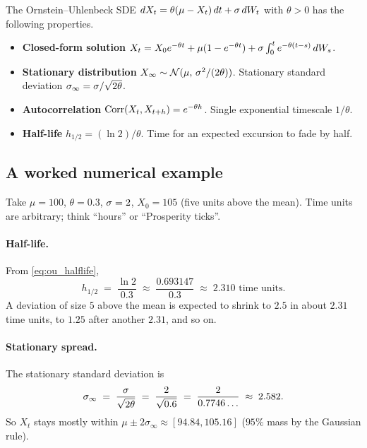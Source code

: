 \begin{keyfactbox}
The Ornstein--Uhlenbeck SDE
\(dX_t = \theta(\mu - X_t)\,dt + \sigma\,dW_t\) with
$\theta > 0$ has the following properties.
\begin{itemize}
  \item \textbf{Closed-form solution}
  $X_t = X_0 e^{-\theta t} + \mu(1 - e^{-\theta t})
       + \sigma\int_0^t e^{-\theta(t-s)}\,dW_s$.
  \item \textbf{Stationary distribution}
  $X_\infty \sim \mathcal{N}(\mu,\, \sigma^2/(2\theta))$.
  Stationary standard deviation
  $\sigma_\infty = \sigma/\sqrt{2\theta}$.
  \item \textbf{Autocorrelation}
  $\operatorname{Corr}(X_t, X_{t+h}) = e^{-\theta h}$. Single exponential
  timescale $1/\theta$.
  \item \textbf{Half-life}
  $h_{1/2} = (\ln 2)/\theta$. Time for an expected
  excursion to fade by half.
\end{itemize}
\end{keyfactbox}

\subsection{A worked numerical example}
\label{subsec:ch9_worked_ou}

Take $\mu = 100$, $\theta = 0.3$, $\sigma = 2$, $X_0 = 105$
(five units above the mean). Time units are arbitrary; think
``hours'' or ``Prosperity ticks''.

\paragraph{Half-life.} From \eqref{eq:ou_halflife},
\begin{equation}
  h_{1/2} \;=\; \frac{\ln 2}{0.3}
            \;\approx\; \frac{0.693147}{0.3}
            \;\approx\; 2.310 \text{ time units}.
  \label{eq:ch9_worked_halflife}
\end{equation}
A deviation of size $5$ above the mean is expected to shrink to
$2.5$ in about $2.31$ time units, to $1.25$ after another $2.31$,
and so on.

\paragraph{Stationary spread.} The stationary standard deviation
is
\begin{equation}
  \sigma_\infty \;=\; \frac{\sigma}{\sqrt{2\theta}}
                \;=\; \frac{2}{\sqrt{0.6}}
                \;=\; \frac{2}{0.7746\ldots}
                \;\approx\; 2.582.
  \label{eq:ch9_worked_sigmainf}
\end{equation}
So $X_t$ stays mostly within $\mu \pm 2\sigma_\infty
\approx [94.84, 105.16]$ ($95\%$ mass by the Gaussian rule).


